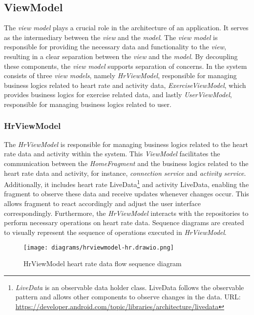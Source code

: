 \subsection{ViewModel}
\label{chap:viewmodel_design}
The \emph{view model} plays a crucial role in the architecture of an application. It serves as the intermediary between the \emph{view} and the \emph{model}.
The \emph{view model} is responsible for providing the necessary data and functionality to the \emph{view}, resulting in a clear separation between the \emph{view} and the \emph{model}.
By decoupling these components, the \emph{view model} supports separation of concerns.
In the system consists of three \emph{view models}, namely \emph{HrViewModel}, responsible for managing business logics related to heart rate and activity data, \emph{ExerciseViewModel}, which provides business logics for exercise related data, and lastly \emph{UserViewModel}, responsible for managing business logics related to user.

\subsubsection{HrViewModel}
The \emph{HrViewModel} is responsible for managing business logics related to the heart rate data and activity within the system.
This \emph{ViewModel} facilitates the communication between the \emph{HomeFragment} and the business logics related to the heart rate data and activity, for instance, \emph{connection service} and \emph{activity service}.
Additionally, it includes heart rate LiveData\footnote{\emph{LiveData} is an observable data holder class. LiveData follows the observable pattern and allows other components to observe changes in the data. URL: \url{https://developer.android.com/topic/libraries/architecture/livedata}} and activity LiveData, enabling the fragment to observe these data and receive updates whenever changes occur. This allows fragment to react accordingly and adjust the user interface correspondingly.
Furthermore, the \emph{HrViewModel} interacts with the repositories to perform necessary operations on heart rate data.
Sequence diagrams are created to visually represent the sequence of operations executed in \emph{HrViewModel}.

\begin{figure}[H]
    \centering
    \texttt{[image: diagrams/hrviewmodel-hr.drawio.png]}
    \caption{HrViewModel heart rate data flow sequence diagram}
    \label{fig:hrviewmodel_hrdata}
\end{figure}

